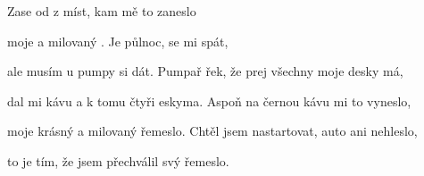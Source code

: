 
\zs

Zase od z míst, kam mě to zaneslo

moje  a milovaný .
\ks
\zr
Je půlnoc,  se mi spát,

ale  musím u pumpy si  dát.
\kr
\zs
Pumpař řek, že prej všechny moje desky má,

dal mi kávu a k tomu čtyři eskyma.
\ks
\zr     \kr
\zs
Aspoň na černou kávu mi to vyneslo,

moje krásný a milovaný řemeslo.
\ks
\zr     \kr
\zs
Chtěl jsem nastartovat, auto ani nehleslo,

to je tím, že jsem přechválil svý řemeslo.
\ks
\zr     \kr
\kp


